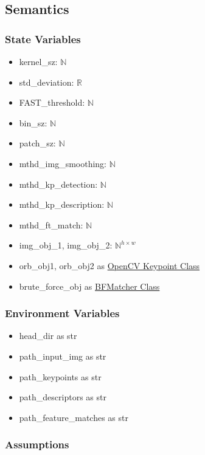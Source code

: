\documentclass[12pt, titlepage]{article}
\begin{document}
\subsection{Semantics}

\subsubsection{State Variables}
\begin{itemize}
  \item kernel\_sz: $\mathbb{N}$
  \item std\_deviation: $\mathbb{R}$
  \item FAST\_threshold: $\mathbb{N}$
  \item bin\_sz: $\mathbb{N}$
  \item patch\_sz: $\mathbb{N}$
  \item mthd\_img\_smoothing: $\mathbb{N}$
  \item mthd\_kp\_detection: $\mathbb{N}$
  \item mthd\_kp\_description: $\mathbb{N}$
  \item mthd\_ft\_match: $\mathbb{N}$
  \item img\_obj\_1, img\_obj\_2: $\mathbb{N}^{h \times w}$ 
  \item orb\_obj1, orb\_obj2 as \href{https://docs.opencv.org/3.4/d2/d29/classcv_1_1KeyPoint.html}
  {OpenCV Keypoint Class}
  \item brute\_force\_obj as \href{https://docs.opencv.org/3.4/d3/da1/classcv_1_1BFMatcher.html}{BFMatcher Class}
\end{itemize}



\subsubsection{Environment Variables}
\begin{itemize}
  \item head\_dir as str
  \item path\_input\_img as str 
  \item path\_keypoints as str
  \item path\_descriptors as str
  \item path\_feature\_matches as str
\end{itemize}


\subsubsection{Assumptions}
\end{document}

